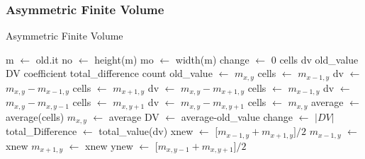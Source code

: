 \documentclass[aps,twocolumn,pre,nofootinbib,10pt]{revtex4-1}
\newcommand*\Let[2]{\State #1 $\gets$ #2}
\begin{document}
\subsubsection{Asymmetric Finite Volume}

\begin{algorithm}
    \caption{Asymmetric Finite Volume}
    \label{alg:afv}
    \begin{algorithmic}
        \Let{m}{old.it}
        \Let{no}{height(m)}
        \Let{mo}{width(m)}
        \Let{change}{0}
        \State cells
        \State dv
        \State old\_value
        \State DV
        \State coefficient
        \State total\_difference
        \State count
                \Let{old\_value}{$m_{x,y}$}
                    \Let{cells}{$m_{x-1,y}$}
                    \Let{dv}{$m_{x,y} - m_{x-1,y}$}
                \EndIf
                    \Let{cells}{$m_{x+1,y}$}
                    \Let{dv}{$m_{x,y} - m_{x+1,y}$}
                \EndIf
                    \Let{cells}{$m_{x-1,y}$}
                    \Let{dv}{$m_{x,y} - m_{x,y-1}$}
                \EndIf
                    \Let{cells}{$m_{x,y+1}$}
                    \Let{dv}{$m_{x,y} - m_{x,y+1}$}
                \EndIf
                \Let{cells}{$m_{x,y}$}
                \Let{average}{average(cells)}
                    \Let{$m_{x,y}$}{average}
                    \Let{DV}{average-old\_value}
                        \Let{change}{$|DV|$}
                    \EndIf
                    \Let{total\_Difference}{total\_value(dv)}
                            \Let{xnew}{[$m_{x-1,y}+m_{x+1,y}]/2$}
                                \Let{$m_{x-1,y}$}{xnew}
                            \EndIf
                                \Let{$m_{x+1,y}$}{xnew}
                            \EndIf
                        \EndIf
                            \Let{ynew}{[$m_{x,y-1}+m_{x,y+1}]/2$}

\end{algorithmic}
\end{algorithm}
\end{document}
